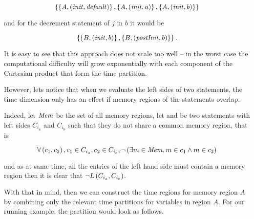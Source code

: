 \documentclass[..thesis.tex]{subfiles}
\begin{document}
\begin{equation*}
\left\lbrace \left\lbrace A, \left( \mathit{init}, \mathit{default} \right) \right\rbrace, \left\lbrace A, \left( \mathit{init}, a  \right) \right\rbrace, \left\lbrace A, \left( \mathit{init}, b \right) \right\rbrace \right\rbrace
\end{equation*}

and for the decrement statement of $j$ in $b$ it would be

\begin{equation*}
\left\lbrace \left\lbrace B, \left( \mathit{init}, b \right)  \right\rbrace, \left\lbrace B, \left( \mathit{postInit}, b \right) \right\rbrace \right\rbrace \text{.}
\end{equation*}


It is easy to see that this approach does not scale too well -- in the worst case the computational difficulty will grow exponentially
with each component of the Cartesian product that form the time partition.

However, lets notice that when we evaluate the left sides of two statements, the time dimension only has an effect if memory regions of the statements overlap. 

Indeed, let $\mathit{Mem}$ be the set of all memory regions, let  and  be two statements with left sides $C_{i_{a}}$ and $C_{i_{b}}$ such that they do not share a common memory region, that is

\begin{equation*}
\forall \left( c_1, c_2 \right), c_1 \in C_{i_a} , c_2 \in C_{i_b} , \lnot \left( \exists m \in \mathit{Mem},  m \in c_1 \land m \in c_2 \right)
\end{equation*} 

and as at same time, all the entries of the left hand side must contain a memory region then it is clear that $\lnot L \left( C_{i_{a}}, C_{i_{b}} \right) $. 

With that in mind, then we can construct the time regions for memory region $A$ by combining only the relevant time partitions for variables in region $A$. 
For our running example, the partition would look as follows.
\end{document}
